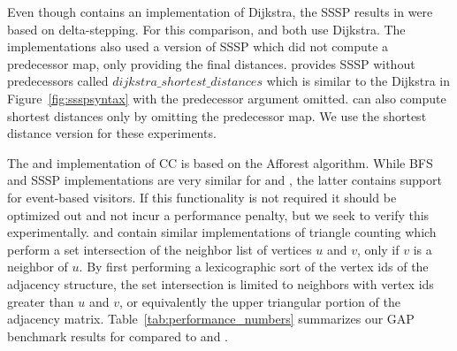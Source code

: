 Even though \nwgraph contains an implementation of Dijkstra, the SSSP results in \cite{REF_nwgraph_library}
were based on delta-stepping. For this comparison, \stdgraph and \nwgraph both use Dijkstra.
The \nwgraph implementations also used a version of SSSP which did not compute
a predecessor map, only providing the final distances.
\stdgraph provides SSSP without predecessors called $dijkstra\_shortest\_distances$ which is similar to the Dijkstra in
Figure~\ref{fig:ssspsyntax} with the predecessor argument omitted.
\bgl can also compute shortest distances only by omitting the predecessor map.
We use the shortest distance version for these experiments.

The \nwgraph and \stdgraph implementation of CC is based on the Afforest \cite{sutton2018optimizing} algorithm.
While BFS and SSSP implementations are very similar for \nwgraph and \stdgraph, the latter contains
support for event-based visitors.
If this functionality is not required it should be optimized out and not
incur a performance penalty,
but we seek to verify this experimentally.
\nwgraph and \stdgraph contain similar implementations of triangle
counting which perform a set intersection of the neighbor list of vertices
$u$ and $v$, only if $v$ is a neighbor of $u$.
By first performing a lexicographic sort of the vertex ids of the adjacency
structure, the set intersection is limited to neighbors with vertex ids greater
than $u$ and $v$, or equivalently the upper triangular portion of the adjacency
matrix.
Table~\ref{tab:performance_numbers} summarizes our GAP benchmark results for \stdgraph compared to \bgl and \nwgraph.

